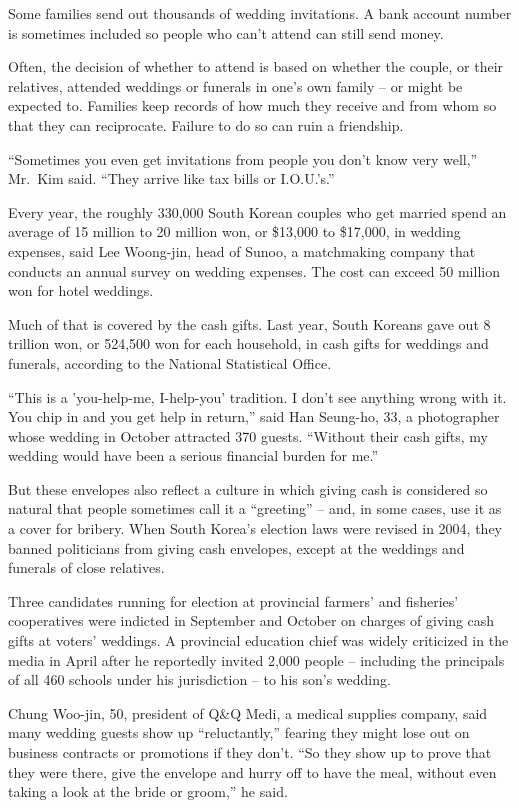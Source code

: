 ﻿\documentclass[12pt]{article}
\begin{document}
Some families send out thousands of wedding invitations. A bank account number is sometimes included
so people who can't attend can still send money.

Often, the decision of whether to attend is based on whether the couple, or their relatives,
attended weddings or funerals in one's own family -- or might be expected to. Families keep records
of how much they receive and from whom so that they can reciprocate. Failure to do so can ruin a
friendship.

``Sometimes you even get invitations from people you don't know very well,'' Mr.~Kim said. ``They
arrive like tax bills or I.O.U.'s.''

Every year, the roughly 330,000 South Korean couples who get married spend an average of 15 million
to 20 million won, or \$13,000 to \$17,000, in wedding expenses, said Lee Woong-jin, head of Sunoo,
a matchmaking company that conducts an annual survey on wedding expenses. The cost can exceed 50
million won for hotel weddings.

Much of that is covered by the cash gifts. Last year, South Koreans gave out 8 trillion won, or
524,500 won for each household, in cash gifts for weddings and funerals, according to the National
Statistical Office.

``This is a 'you-help-me, I-help-you' tradition. I don't see anything wrong with it. You chip in and
you get help in return,'' said Han Seung-ho, 33, a photographer whose wedding in October attracted
370 guests. ``Without their cash gifts, my wedding would have been a serious financial burden for
me.''

But these envelopes also reflect a culture in which giving cash is considered so natural that people
sometimes call it a ``greeting'' -- and, in some cases, use it as a cover for bribery. When South
Korea's election laws were revised in 2004, they banned politicians from giving cash envelopes,
except at the weddings and funerals of close relatives.

Three candidates running for election at provincial farmers' and fisheries' cooperatives were
indicted in September and October on charges of giving cash gifts at voters' weddings. A provincial
education chief was widely criticized in the media in April after he reportedly invited 2,000 people
-- including the principals of all 460 schools under his jurisdiction -- to his son's wedding.

Chung Woo-jin, 50, president of Q\&Q Medi, a medical supplies company, said many wedding guests show
up ``reluctantly,'' fearing they might lose out on business contracts or promotions if they don't.
``So they show up to prove that they were there, give the envelope and hurry off to have the meal,
without even taking a look at the bride or groom,'' he said.
\end{document}
